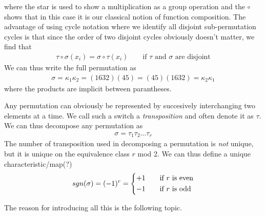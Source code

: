 where the star is used to show a multiplication as a group operation and the \(\circ \) shows that in this case it is our classical notion of function composition. The advantage of using cycle notation where we identify all disjoint sub-permutation cycles is that since the order of two disjoint cycles obviously doesn't matter, we find that \begin{align*}
    \tau \circ \sigma (x_i) = \sigma \circ \tau (x_i)\qquad \text{if \(\tau\) and \(\sigma\) are disjoint}
\end{align*}
We can thus write the full permutation as\begin{align*}
    \sigma = \kappa_1 \kappa _2 = (1632)(45) = (45)(1632) = \kappa _2 \kappa _1
\end{align*}
where the products are implicit between parantheses.

Any permutation can obviously be represented by succesively interchanging two elements at a time. We call such a switch a \textit{transposition} and often denote it as \(\tau\). We can thus decompose any permutation as \begin{align*}
    \sigma = \tau _1 \tau _2\dots \tau _r
\end{align*} 
The number of transposition used in decomposing a permutation is \textit{not} unique, but it is unique on the equivalence class \(r\) mod 2. We can thus define a unique characteristic/map(?) \begin{align*}
    sgn(\sigma) = (-1)^r = \begin{dcases}
        +1 \quad &\text{if \(r\) is even}\\
        -1 \quad &\text{if \(r\) is odd}
    \end{dcases}
\end{align*}

The reason for introducing all this is the following topic.

